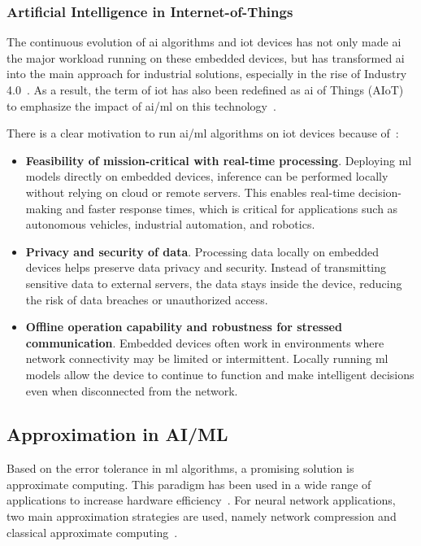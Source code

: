 \subsubsection{Artificial Intelligence in Internet-of-Things}
The continuous evolution of \gls{ai} algorithms and \gls{iot} devices has not only made \gls{ai} the major workload running on these embedded devices, but has transformed \gls{ai} into the main approach for industrial solutions, especially in the rise of Industry 4.0~\cite{alcacer2019scanning}. As a result, the term of \gls{iot} has also been redefined as \gls{ai} of Things (AIoT) to emphasize the impact of \gls{ai}/\gls{ml} on this technology~\cite{zhang2020empowering}.

There is a clear motivation to run \gls{ai}/\gls{ml} algorithms on \gls{iot} devices because of~\cite{loh20201}:

\begin{itemize}
	\item \textbf{Feasibility of mission-critical with real-time processing}. Deploying \gls{ml} models directly on embedded devices, inference can be performed locally without relying on cloud or remote servers. This enables real-time decision-making and faster response times, which is critical for applications such as autonomous vehicles, industrial automation, and robotics.
	\item \textbf{Privacy and security of data}. Processing data locally on embedded devices helps preserve data privacy and security. Instead of transmitting sensitive data to external servers, the data stays inside the device, reducing the risk of data breaches or unauthorized access.
	\item \textbf{Offline operation capability and robustness for stressed communication}. Embedded devices often work in environments where network connectivity may be limited or intermittent. Locally running \gls{ml} models allow the device to continue to function and make intelligent decisions even when disconnected from the network.
\end{itemize}


\subsection{Approximation in AI/ML}
Based on the error tolerance in \gls{ml} algorithms, a promising solution is approximate computing. This paradigm has been used in a wide range of applications to increase hardware efficiency~\cite{han2013approximate}. For neural network applications, two main approximation strategies are used, namely network compression and classical approximate computing~\cite{bouvier2019spiking}.

